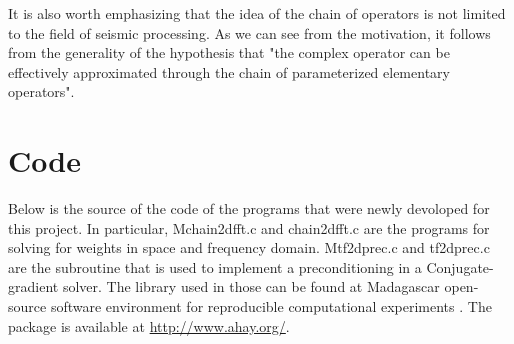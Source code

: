 It is also worth emphasizing that the idea of the chain of operators is not limited to the field of seismic processing. As we can see from the motivation, it follows from the generality of the hypothesis that "the complex operator can be effectively approximated through the chain of parameterized elementary operators".

\appendix
\section{Code}
Below is the source of the code of the programs that were newly devoloped for this project. In particular, Mchain2dfft.c and chain2dfft.c are the programs for solving for weights in space and frequency domain. Mtf2dprec.c and tf2dprec.c are the subroutine that is used to implement a preconditioning in a Conjugate-gradient solver. The library used in those can be found at Madagascar open-source software environment for reproducible computational experiments \cite[]{madagascar}. The package is available at \url{http://www.ahay.org/}.


